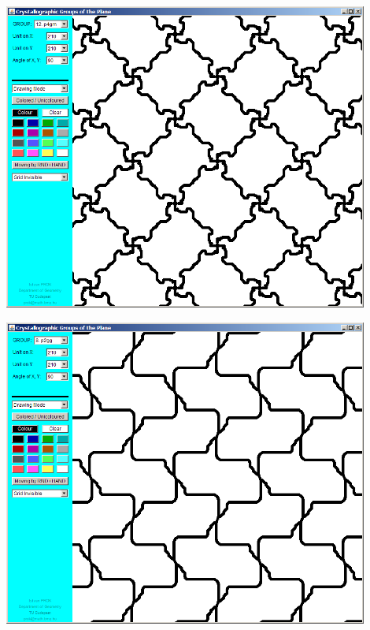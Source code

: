 \begin{frame}
  \includegraphics[width=0.9\textwidth]{illustration6.png}
\end{frame}

\begin{frame}
  \includegraphics[width=0.9\textwidth]{illustration7.png}
\end{frame}

